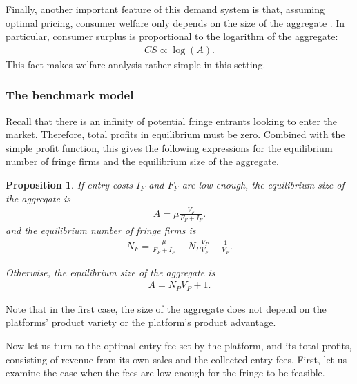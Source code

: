 \documentclass[a4paper]{article}
\newtheorem{proposition}{Proposition}
\begin{document}
Finally, another important feature of this demand system is that, assuming optimal pricing, consumer welfare only depends on the size of the aggregate \parencite{anderson2020aggregative}.
In particular, consumer surplus is proportional to the logarithm of the aggregate:
\begin{align*}
    CS \propto \log(A).
\end{align*}
This fact makes welfare analysis rather simple in this setting.

\subsubsection{The benchmark model}

Recall that there is an infinity of potential fringe entrants looking to enter the market.
Therefore, total profits in equilibrium must be zero.
Combined with the simple profit function, this gives the following expressions for the equilibrium number of fringe firms and the equilibrium size of the aggregate.
\begin{proposition}
    If entry costs $I_F$ and $F_F$ are low enough, the equilibrium size of the aggregate is
    \begin{align}
        A = \mu \frac{V_F}{F_F + I_F}.
        \label{eq:aggregate_eq}
    \end{align}
    and the equilibrium number of fringe firms is
    \begin{align*}
        N_F = \frac{\mu}{F_F + I_F} - N_P \frac{V_P}{V_F} - \frac{1}{V_F}.
    \end{align*}

    Otherwise, the equilibrium size of the aggregate is
    \begin{align*}
        A = N_P V_P + 1.
    \end{align*}
\end{proposition}
Note that in the first case, the size of the aggregate does not depend on the platforms' product variety or the platform's product advantage.

Now let us turn to the optimal entry fee set by the platform, and its total profits, consisting of revenue from its own sales and the collected entry fees.
First, let us examine the case when the fees are low enough for the fringe to be feasible.
\end{document}
